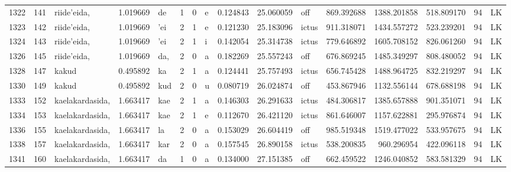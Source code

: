 \begin{tabular}{lrlrllllrrlrrrll}
1322 &         141 &      riide'eida, &  1.019669 &      de &        1 &      0 &       e &      0.124843 &     25.060059 &    off &   869.392688 &  1388.201858 &   518.809170 &     94 &        LK \\
1323 &         142 &      riide'eida, &  1.019669 &     'ei &        2 &      1 &       e &      0.121230 &     25.183096 &  ictus &   911.318071 &  1434.557272 &   523.239201 &     94 &        LK \\
1324 &         143 &      riide'eida, &  1.019669 &     'ei &        2 &      1 &       i &      0.142054 &     25.314738 &  ictus &   779.646892 &  1605.708152 &   826.061260 &     94 &        LK \\
1326 &         145 &      riide'eida, &  1.019669 &     da, &        2 &      0 &       a &      0.182269 &     25.557243 &    off &   676.869245 &  1485.349297 &   808.480052 &     94 &        LK \\
1328 &         147 &            kakud &  0.495892 &      ka &        2 &      1 &       a &      0.124441 &     25.757493 &  ictus &   656.745428 &  1488.964725 &   832.219297 &     94 &        LK \\
1330 &         149 &            kakud &  0.495892 &     kud &        2 &      0 &       u &      0.080719 &     26.024874 &    off &   453.867946 &  1132.556144 &   678.688198 &     94 &        LK \\
1333 &         152 &  kaelakardasida, &  1.663417 &     kae &        2 &      1 &       a &      0.146303 &     26.291633 &  ictus &   484.306817 &  1385.657888 &   901.351071 &     94 &        LK \\
1334 &         153 &  kaelakardasida, &  1.663417 &     kae &        2 &      1 &       e &      0.112670 &     26.421120 &  ictus &   861.646007 &  1157.622881 &   295.976874 &     94 &        LK \\
1336 &         155 &  kaelakardasida, &  1.663417 &      la &        2 &      0 &       a &      0.153029 &     26.604419 &    off &   985.519348 &  1519.477022 &   533.957675 &     94 &        LK \\
1338 &         157 &  kaelakardasida, &  1.663417 &     kar &        2 &      0 &       a &      0.157545 &     26.890158 &  ictus &   538.200835 &   960.296954 &   422.096118 &     94 &        LK \\
1341 &         160 &  kaelakardasida, &  1.663417 &      da &        1 &      0 &       a &      0.134000 &     27.151385 &    off &   662.459522 &  1246.040852 &   583.581329 &     94 &        LK \\

\end{tabular}
